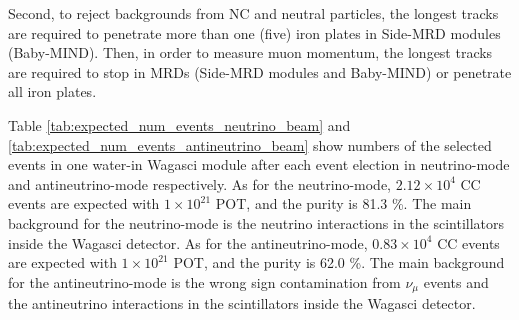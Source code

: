 Second, to reject backgrounds from NC and neutral particles, the longest tracks are required to penetrate more than one (five) iron plates in Side-MRD modules (Baby-MIND). 
Then, in order to measure muon momentum, the longest tracks are required to stop in MRDs (Side-MRD modules and Baby-MIND) or penetrate all iron plates.




Table \ref{tab:expected_num_events_neutrino_beam} and \ref{tab:expected_num_events_antineutrino_beam}  show numbers of the selected events in one water-in Wagasci module after each event election in neutrino-mode and antineutrino-mode respectively.
As for the neutrino-mode, $2.12 \times 10^{4}$ CC events are expected with $1 \times 10^{21}$  POT, and the purity is 81.3 \%.
The main background for the neutrino-mode is the neutrino interactions in the scintillators inside the Wagasci detector.
As for the antineutrino-mode, $0.83 \times 10^{4}$ CC events are expected with $1 \times 10^{21}$  POT, and the purity is 62.0 \%.
The main background for the antineutrino-mode is the wrong sign contamination from $\nu_{\mu}$ events and the antineutrino interactions in the scintillators inside the Wagasci detector.

